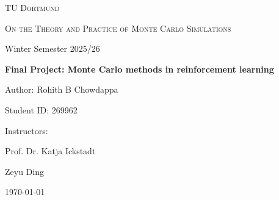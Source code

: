 \documentclass[12pt]{scrartcl}
\begin{document}
\begin{titlepage}
	\centering
	{\scshape\LARGE TU Dortmund \par}
	\vspace{1cm}
	{\scshape\Large On the Theory and Practice of Monte Carlo Simulations \par}
	\vspace{0.5cm}
	{\large Winter Semester 2025/26 \par}
	\vspace{2cm}
	{\huge\bfseries Final Project: Monte Carlo methods in reinforcement learning\par}
	\vspace{3cm}
	{\Large Author: Rohith B Chowdappa \par}
	\vspace{0.5 cm}
	{\large Student ID: 269962 \par}
	\vfill
	{\large Instructors: \par}
	{\large Prof. Dr. Katja Ickstadt \par}
	{\large Zeyu Ding \par}
	\vspace{1cm}
	{\large \today\par}
\end{titlepage}

\tableofcontents
\thispagestyle{empty}

\cleardoublepage

\setcounter{page}{1}





\FloatBarrier %



\end{document}
